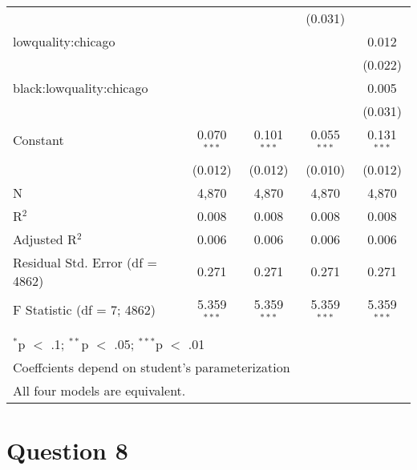 \documentclass[11pt,notitlepage]{article}\usepackage[]{graphicx}\usepackage[]{color}
\makeatletter
\newenvironment{kframe}{%
 \def\at@end@of@kframe{}%
 \ifinner\ifhmode%
  \def\at@end@of@kframe{\end{minipage}}%
  \begin{minipage}{\columnwidth}%
 \fi\fi%
 \def\FrameCommand##1{\hskip\@totalleftmargin \hskip-\fboxsep
 \colorbox{shadecolor}{##1}\hskip-\fboxsep
     \hskip-\linewidth \hskip-\@totalleftmargin \hskip\columnwidth}%
 \MakeFramed {\advance\hsize-\width
   \@totalleftmargin\z@ \linewidth\hsize
   \@setminipage}}%
 {\par\unskip\endMakeFramed%
 \at@end@of@kframe}
\newenvironment{knitrout}{}{} %
\makeatother
\begin{document}
\begin{enumerate}[a)]
\begin{table}[!htbp]
\begin{tabular}{@{\extracolsep{5pt}}lcccc}
  &  &  & (0.031) &  \\ 
  lowquality:chicago &  &  &  & 0.012 \\ 
  &  &  &  & (0.022) \\ 
  black:lowquality:chicago &  &  &  & 0.005 \\ 
  &  &  &  & (0.031) \\ 
  Constant & 0.070$^{***}$ & 0.101$^{***}$ & 0.055$^{***}$ & 0.131$^{***}$ \\ 
  & (0.012) & (0.012) & (0.010) & (0.012) \\ 
 N & 4,870 & 4,870 & 4,870 & 4,870 \\ 
R$^{2}$ & 0.008 & 0.008 & 0.008 & 0.008 \\ 
Adjusted R$^{2}$ & 0.006 & 0.006 & 0.006 & 0.006 \\ 
Residual Std. Error (df = 4862) & 0.271 & 0.271 & 0.271 & 0.271 \\ 
F Statistic (df = 7; 4862) & 5.359$^{***}$ & 5.359$^{***}$ & 5.359$^{***}$ & 5.359$^{***}$ \\ 
\hline \\[-1.8ex] 
\multicolumn{5}{l}{$^{*}$p $<$ .1; $^{**}$p $<$ .05; $^{***}$p $<$ .01} \\ 
\multicolumn{5}{l}{Coeffcients depend on student's parameterization} \\ 
\multicolumn{5}{l}{All four models are equivalent.} \\ 
\end{tabular} 
\end{table} 

\end{enumerate}

\section*{Question 8}
\begin{knitrout}
\color{fgcolor}\begin{kframe}
\begin{verbatim}





\end{verbatim}
\end{kframe}
\end{knitrout}
\end{document}

